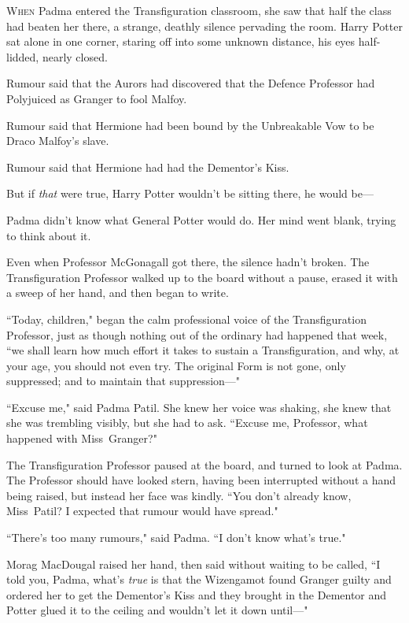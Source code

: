 
\lettrine{W}{hen} Padma entered the Transfiguration classroom, she saw that half the class had beaten her there, a strange, deathly silence pervading the room. Harry Potter sat alone in one corner, staring off into some unknown distance, his eyes half-lidded, nearly closed.

Rumour said that the Aurors had discovered that the Defence Professor had Polyjuiced as Granger to fool Malfoy.

Rumour said that Hermione had been bound by the Unbreakable Vow to be Draco Malfoy's slave.

Rumour said that Hermione had had the Dementor's Kiss.

But if \emph{that} were true, Harry Potter wouldn't be sitting there, he would be—

Padma didn't know what General Potter would do. Her mind went blank, trying to think about it.

Even when Professor McGonagall got there, the silence hadn't broken. The Transfiguration Professor walked up to the board without a pause, erased it with a sweep of her hand, and then began to write.

``Today, children," began the calm professional voice of the Transfiguration Professor, just as though nothing out of the ordinary had happened that week, ``we shall learn how much effort it takes to sustain a Transfiguration, and why, at your age, you should not even try. The original Form is not gone, only suppressed; and to maintain that suppression—"

``Excuse me," said Padma Patil. She knew her voice was shaking, she knew that she was trembling visibly, but she had to ask. ``Excuse me, Professor, what happened with Miss~Granger?"

The Transfiguration Professor paused at the board, and turned to look at Padma. The Professor should have looked stern, having been interrupted without a hand being raised, but instead her face was kindly. ``You don't already know, Miss~Patil? I expected that rumour would have spread."

``There's too many rumours," said Padma. ``I don't know what's true."

Morag MacDougal raised her hand, then said without waiting to be called, ``I told you, Padma, what's \emph{true} is that the Wizengamot found Granger guilty and ordered her to get the Dementor's Kiss and they brought in the Dementor and Potter glued it to the ceiling and wouldn't let it down until—"

